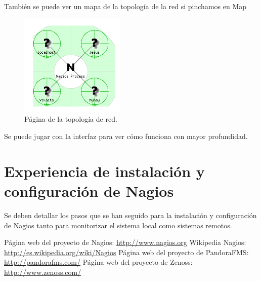 \documentclass[11pt,a4paper]{article}
\begin{document}
También se puede ver un mapa de la topología de la red si pinchamos en Map

\begin{figure}[H]
  \centering
\includegraphics[width=5cm]{images/3.png} 
  \caption{Página de la topología de red.}
\end{figure}

Se puede jugar con la interfaz para ver cómo funciona con mayor profundidad.


\section{Experiencia de instalación y configuración de Nagios}

Se deben detallar los pasos que se han seguido para la instalación y configuración de Nagios
tanto para monitorizar el sistema local como sistemas remotos.

\begin{thebibliography}{1}

 Página web del proyecto de Nagios: \url{http://www.nagios.org}
 Wikipedia Nagios: \url{http://es.wikipedia.org/wiki/Nagios}
 Página web del proyecto de PandoraFMS: \url{http://pandorafms.com/}
 Página web del proyecto de Zenoss: \url{http://www.zenoss.com/}
\end{thebibliography}
\end{document}

